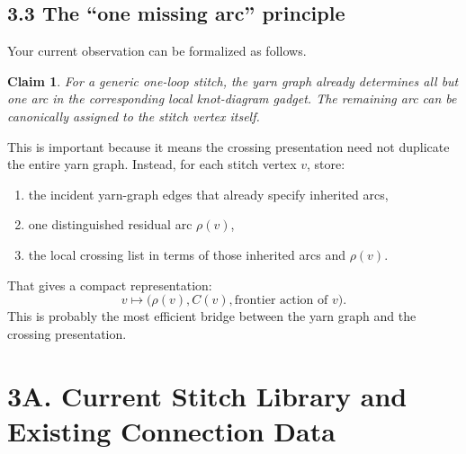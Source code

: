 \documentclass[11pt]{article}
\newtheorem{claim}{Claim}
\begin{document}
\subsection*{3.3 The ``one missing arc'' principle}
Your current observation can be formalized as follows.

\begin{claim}
For a generic one-loop stitch, the yarn graph already determines all but one arc in the corresponding local knot-diagram gadget. The remaining arc can be canonically assigned to the stitch vertex itself.
\end{claim}

This is important because it means the crossing presentation need not duplicate the entire yarn graph. Instead, for each stitch vertex \(v\), store:
\begin{enumerate}[leftmargin=1.5em,itemsep=0.2em]
    \item the incident yarn-graph edges that already specify inherited arcs,
    \item one distinguished residual arc \(\rho(v)\),
    \item the local crossing list in terms of those inherited arcs and \(\rho(v)\).
\end{enumerate}

That gives a compact representation:
\[
v \mapsto \bigl(\rho(v), C(v), \text{frontier action of }v\bigr).
\]
This is probably the most efficient bridge between the yarn graph and the crossing presentation.

\section*{3A. Current Stitch Library and Existing Connection Data}
\end{document}
